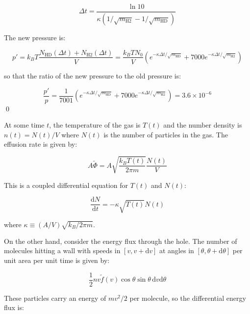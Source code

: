 \documentclass[12pt]{article}
\begin{document}
\begin{equation}
    \Delta t = \frac{\ln{10}}{\kappa(1/\sqrt{m_{\text{H2}}} - 1/\sqrt{m_{\text{HD}}})}
\end{equation}

The new pressure is:

\begin{equation}
    p' = k_{B}T \frac{N_{\text{HD}}(\Delta t) + N_{\text{H2}}(\Delta t)}{V} = \frac{k_{B}TN_{0}}{V} \left( e^{-\kappa \Delta t/\sqrt{m_{\text{HD}}}} + 7000 e^{-\kappa \Delta t/\sqrt{m_{\text{H2}}}} \right)
\end{equation}

so that the ratio of the new pressure to the old pressure is:

\begin{equation}
    \frac{p'}{p} = \frac{1}{7001} \left( e^{-\kappa \Delta t/\sqrt{m_{\text{HD}}}} + 7000 e^{-\kappa \Delta t/\sqrt{m_{\text{H2}}}} \right) = 3.6 \times 10^{-6}
\end{equation}
\qed


At some time $t$, the temperature of the gas is $T(t)$ and the number density is $n(t) = N(t)/V$ where $N(t)$ is the number of particles in the gas. The effusion rate is given by:

\begin{equation}
    A\tilde{\Phi} = A \sqrt{\frac{k_{B}T(t)}{2\pi m}} \frac{N(t)}{V}
\end{equation}

This is a coupled differential equation for $T(t)$ and $N(t)$:

\begin{equation}
    \frac{\mathrm{d}N}{\mathrm{d}t} = -\kappa \sqrt{T(t)} N(t)
\end{equation}

where $\kappa \equiv (A/V) \sqrt{k_{B}/2\pi m}$.

On the other hand, consider the energy flux through the hole. The number of molecules hitting a wall with speeds in $[v, v + \mathrm{d}v]$ at angles in $[\theta, \theta + \mathrm{d}\theta]$ per unit area per unit time is given by:

\begin{equation}
    \frac{1}{2} nv \tilde{f}(v) \cos{\theta} \sin{\theta} \, \mathrm{d}v \mathrm{d}\theta
\end{equation}

These particles carry an energy of $mv^{2}/2$ per molecule, so the differential energy flux is:
\end{document}
